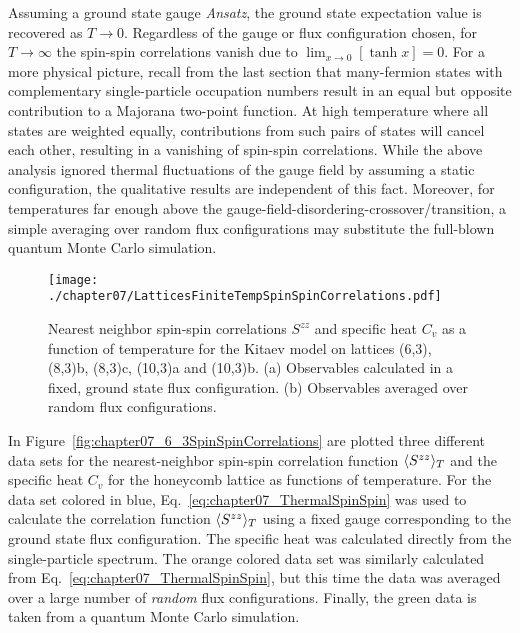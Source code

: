 Assuming a ground state gauge \textit{Ansatz}, the ground state expectation value is recovered as $T\rightarrow 0$.
Regardless of the gauge or flux configuration chosen, for $T\rightarrow \infty$ the spin-spin correlations vanish due to $\lim_{x\rightarrow 0} \left[\tanh{x}\right] = 0$.
For a more physical picture, recall from the last section that many-fermion states with complementary single-particle occupation numbers result in an equal but opposite contribution to a Majorana two-point function.
At high temperature where all states are weighted equally, contributions from such pairs of states will cancel each other, resulting in a vanishing of spin-spin correlations.
While the above analysis ignored thermal fluctuations of the gauge field by assuming a static configuration, the qualitative results are independent of this fact.
Moreover, for temperatures far enough above the gauge-field-disordering-crossover/transition, a simple averaging over random flux configurations may substitute the full-blown quantum Monte Carlo simulation.
%
\begin{figure}[tb]
	\centering
	\texttt{[image: ./chapter07/LatticesFiniteTempSpinSpinCorrelations.pdf]}
	\caption{
		Nearest neighbor spin-spin correlations $S^{zz}$ and specific heat $C_v$ as a function of temperature for the Kitaev model on lattices (6,3), (8,3)b, (8,3)c, (10,3)a and (10,3)b.
		(a) Observables calculated in a fixed, ground state flux configuration.
		(b) Observables averaged over random flux configurations.
	}
	\label{fig:chapter07_LatticesSpinSpinCorrelations}
\end{figure}
%

In Figure~\ref{fig:chapter07_6_3SpinSpinCorrelations} are plotted three different data sets for the nearest-neighbor spin-spin correlation function $\langle S^{zz} \rangle_T$ and the specific heat $C_v$ for the honeycomb lattice as functions of temperature.
For the data set colored in blue, Eq.~\eqref{eq:chapter07_ThermalSpinSpin} was used to calculate the correlation function $\langle S^{zz} \rangle_T$ using a fixed gauge corresponding to the ground state flux configuration.
The specific heat was calculated directly from the single-particle spectrum.
The orange colored data set was similarly calculated from Eq.~\eqref{eq:chapter07_ThermalSpinSpin}, but this time the data was averaged over a large number of \textit{random} flux configurations.
Finally, the green data is taken from a quantum Monte Carlo simulation.

